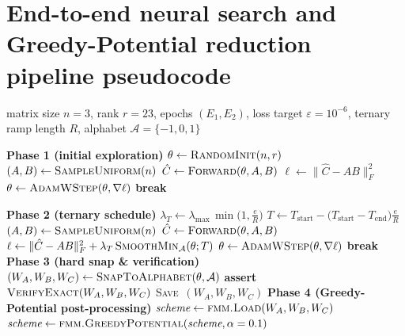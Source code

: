 \documentclass[11pt]{article}
\begin{document}
\section{End-to-end neural search and Greedy-Potential reduction pipeline pseudocode}

\begin{algorithm}[H]
\caption{End-to-end neural search and Greedy-Potential reduction pipeline}
\label{alg:pipeline}
\begin{algorithmic}[1]

\Require matrix size $n\!=\!3$,\; rank $r\!=\!23$,\; epochs
         $(E_1,E_2)$,\; loss target $\varepsilon\!=\!10^{-6}$,\;
         ternary ramp length $R$,\; alphabet $\mathcal{A}=\{-1,0,1\}$
\Statex

\State \textbf{Phase 1 (initial exploration)}
\State $\theta \gets \textsc{RandomInit}(n,r)$
                     
    \State $(A,B) \gets \textsc{SampleUniform}(n)$
    \State $\hat C \gets \textsc{Forward}(\theta,A,B)$
    \State $\ell \gets \| \hat C - AB \|_F^2$
    \State $\theta \gets \textsc{AdamWStep}(\theta,\nabla\ell)$ \cite{loshchilov2017}
    \If{$\ell < \varepsilon$} 
        \State \textbf{break} 
    \EndIf
\EndFor


\Statex
\State \textbf{Phase 2 (ternary schedule)}
    \State $\lambda_T \gets \lambda_{\max}\,\min\!\bigl(1,\tfrac{e}{R}\bigr)$
    \State $T \gets T_{\text{start}} - \bigl(T_{\text{start}}-T_{\text{end}}\bigr)\frac{e}{R}$
    \State $(A,B) \gets \textsc{SampleUniform}(n)$
    \State $\hat C \gets \textsc{Forward}(\theta,A,B)$
    \State $\ell \gets \| \hat C - AB \|_F^2
                 + \lambda_T \,\textsc{SmoothMin}_{\mathcal{A}}(\theta;T)$
    \State $\theta \gets \textsc{AdamWStep}(\theta,\nabla\ell)$
         \State \textbf{break} 
    \EndIf
\EndFor
\Statex
\State \textbf{Phase 3 (hard snap \& verification)}
\State $(W_A,W_B,W_C) \gets \textsc{SnapToAlphabet}(\theta,\mathcal{A})$
\State \textbf{assert} $\textsc{VerifyExact}(W_A,W_B,W_C)$
\State \textsc{Save}~$(W_A,W_B,W_C)$
\Statex
\State \textbf{Phase 4 (Greedy-Potential post-processing)}
\State $\textit{scheme} \gets \textsc{fmm.Load}(W_A,W_B,W_C)$
\State $\textit{scheme} \gets \textsc{fmm.GreedyPotential}(\textit{scheme},\alpha=0.1)$
\end{algorithmic}
\end{algorithm}
\end{document}
